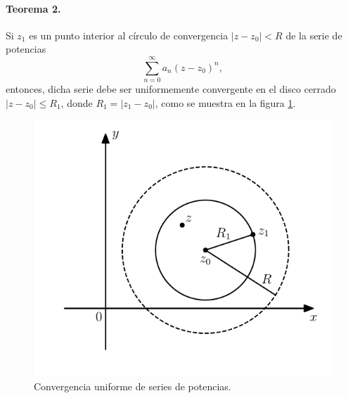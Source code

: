 \documentclass[a4paper]{report}
\begin{document}
\paragraph{Teorema 2.} Si \(z_1\) es un punto interior al círculo de convergencia \(|z-z_0|<R\) de la serie de potencias 
\begin{equation}\label{eq:power_series_generic_definition_tmp2}
 \sum_{n=0}^\infty a_n(z-z_0)^n ,
\end{equation}
entonces, dicha serie debe ser uniformemente convergente en el disco cerrado \(|z-z_0|\leq R_1\), donde \(R_1=|z_1-z_0|\), como se muestra en la figura \ref{fig:series_uniform_convergence}. 
\begin{figure}[!htb]
  \begin{minipage}[c]{0.5\textwidth}
    \includegraphics[width=\textwidth]{figuras/series_uniform_convergence.pdf}
  \end{minipage}\hfill
  \begin{minipage}[c]{0.4\textwidth}
    \caption{
        Convergencia uniforme de series de potencias.
    }\label{fig:series_uniform_convergence}
  \end{minipage}
\end{figure} 
 
\end{document}
